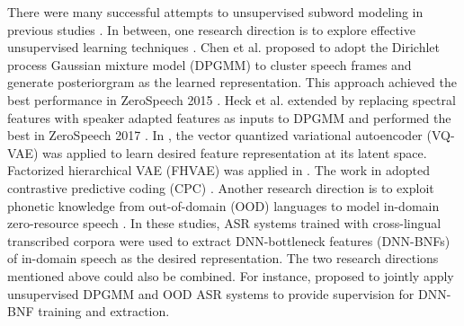 \documentclass[a4paper]{article}
\begin{document}
There were many successful attempts to unsupervised subword modeling in previous studies \cite{chen2015parallel,heck2017feature,chorowski2019unsupervised,shibata2017composite,feng2019_TASLP,riviere2020unsupervised,Feng2019combining}. In between, one research direction is to explore effective unsupervised learning techniques 
\cite{chen2015parallel,heck2017feature,chorowski2019unsupervised}. Chen et al. \cite{chen2015parallel} proposed to adopt the Dirichlet process Gaussian mixture model (DPGMM) to cluster speech frames and generate posteriorgram as the learned  representation. This approach achieved the best performance in ZeroSpeech 2015 \cite{versteegh2015zero}. Heck et al. \cite{heck2017feature} extended \cite{chen2015parallel} by replacing spectral features with speaker adapted features as inputs to DPGMM and performed the best in ZeroSpeech 2017 \cite{heck2017feature}. 
In  \cite{chorowski2019unsupervised}, the vector quantized variational autoencoder (VQ-VAE) \cite{oord2017neural} was applied to learn desired feature representation at its latent space. Factorized hierarchical VAE (FHVAE) was applied in \cite{Feng2019improving}. 
The work in \cite{riviere2020unsupervised} adopted contrastive predictive coding (CPC) \cite{oord2018cpc}.
Another research direction is to exploit phonetic knowledge from out-of-domain (OOD) languages to model  in-domain zero-resource speech \cite{feng2019_TASLP,shibata2017composite}. In these studies, ASR systems trained with cross-lingual transcribed  corpora were used to extract  DNN-bottleneck features (DNN-BNFs) of in-domain speech as the desired representation.
The two research directions mentioned above could also be combined.
For instance, \cite{feng2019_TASLP} proposed 
to jointly  apply  unsupervised DPGMM  and OOD ASR systems to provide supervision for DNN-BNF training and extraction. 
\end{document}

